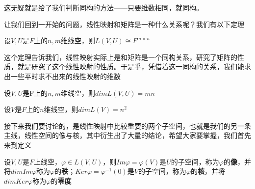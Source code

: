 \documentclass[lang=cn,10pt]{elegantbook}
\begin{document}
	这无疑就是给了我们判断同构的方法——只要维数相同，就同构。
	
	让我们回到一开始的问题，线性映射和矩阵是一种什么关系呢？我们有以下定理
	\begin{theorem}
		设$V,U$是$F$上的$n,m$维线空，则$L(V,U)\cong F^{m\times n}$
	\end{theorem}
	
	这个定理告诉我们，线性映射实际上是和矩阵是一个同构关系，研究了矩阵的性质，就是研究了这个线性映射的性质。于是乎，凭借着这一同构的关系，我们能求出一些平时求不出来的线性映射的维数
	
	\begin{conclusion}
		设$V,U$是F上的$n,m$维线空，则$dim{L}(V,U)=mn$
		
		设$V$是$F$上的$n$维线空，则$dim{L}(V)=n^2$
	\end{conclusion}
	
	接下来我们要讨论的，是线性映射中比较重要的两个子空间，也就是我们的另一条主线，线性空间的像与核，其中衍生出了大量的结论，希望大家要掌握，我们首先来到定义
	
	\begin{definition}[像与核]
		设$V,U$是$F$上线空，$\varphi\in L(V,U)$，则$Im{\varphi}=\varphi(V)$是$U$的子空间，称为$\varphi$的\textbf{像}，并将$dimIm{\varphi}$称为$\varphi$的\textbf{秩}；$Ker\varphi=\varphi^{-1}(0)$是$V$的子空间，称为$\varphi$的\textbf{核}，并将$dimKer\varphi$称为$\varphi$的\textbf{零度}
	\end{definition}
	
\end{document}
